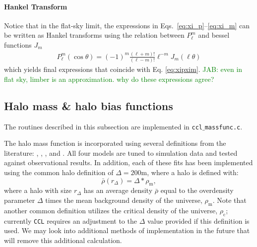 \documentclass[\docopts]{\docclass}
\newcommand{\jab}[1]{\textcolor{green}{JAB: #1}}
\begin{document}
\paragraph{Hankel Transform}
Notice that in the flat-sky limit, the expressions in Eqs.~\ref{eq:xi_p}--\ref{eq:xi_m} can be written as Hankel transforms using the relation between $P_{\ell}^m$ and bessel functions $J_m$
\begin{align}
  P_{\ell}^m(\cos\theta)=(-1)^m\frac{(\ell+m)!}{(\ell-m)!}\ell^{-m}J_m(\ell\theta)
\end{align}
which yields final expressions that coincide with Eq. \ref{eq:xipxim}. \jab{even in flat sky, limber is an approximation. why do these expressions agree?}


\subsection{Halo mass \& halo bias functions}
\label{sec:hmf}

The routines described in this subsection are implemented in {\tt ccl$\_$massfunc.c}.

The halo mass function is incorporated using several definitions from the literature: \citet{Tinker2008}, \citet{Tinker2010}, \citet{Angulo2012}, and \citet{Watson2013}. All four models are tuned to simulation data and tested against observational results. In addition, each of these fits has been implemented using the common halo definition of $\Delta = 200{\mathrm{m}}$, where a halo is defined with:
\begin{equation}
\bar{\rho}(r_{\Delta}) = \Delta*\rho_{\mathrm{m}},
\end{equation}
where a halo with size $r_{\Delta}$ has an average density $\bar{\rho}$ equal to the overdensity parameter $\Delta$ times the mean background density of the universe, $\rho_{\mathrm{m}}$. Note that another common definition utilizes the critical density of the universe, $\rho_{\mathrm{c}}$; currently {\tt CCL} requires an adjustment to the $\Delta$ value provided if this definition is used. We may look into additional methods of implementation in the future that will remove this additional calculation.
\end{document}
